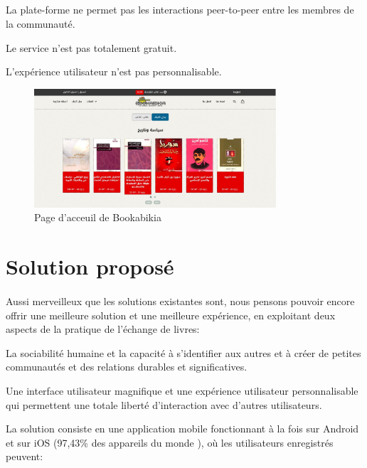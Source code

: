 \subparagraph*{}
\begin{list}{•}{\textbf{Inconvénients}}
	\item La plate-forme ne permet pas les interactions peer-to-peer entre les membres de la communauté.
	\item Le service n'est pas totalement gratuit.
	\item L'expérience utilisateur n'est pas personnalisable.
\end{list}

\begin{figure}[h]
	\begin{center}
		\includegraphics[width=9cm]{Images/chapter1/bookabikiaScreenshot.jpg}
		\caption{Page d'acceuil de Bookabikia}
	\end{center}
\end{figure}

\newpage
\section{Solution proposé}
\paragraph*{}
Aussi merveilleux que les solutions existantes sont, nous pensons pouvoir encore offrir une meilleure solution et une meilleure expérience, en exploitant deux aspects de la pratique de l'échange de livres:

\begin{list}{•}{}
	\item La sociabilité humaine et la capacité à s'identifier aux autres et à créer de petites communautés et des relations durables et significatives.
	\item Une interface utilisateur magnifique et une expérience utilisateur personnalisable qui permettent une totale liberté d'interaction avec d'autres utilisateurs.
\end{list}

La solution consiste en une application mobile fonctionnant à la fois sur Android et sur iOS (97,43\% des appareils du monde \cite{noauthor_mobile_nodate}), où les utilisateurs enregistrés peuvent:

